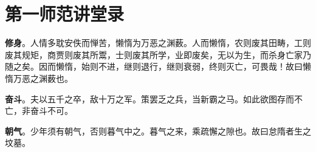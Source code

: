 
\section[第一师范讲堂录（一九一三年十一月一日）]{第一师范讲堂录}

\textbf{修身}。人情多耽安佚而惮苦，懒惰为万恶之渊薮。人而懒惰，农则废其田畴，工则废其规矩，商贾则废其所鬻，士则废其所学，业即废矣，无以为生，而杀身亡家乃随之矣。因而懒惰，始则不进，继则退行，继则衰弱，终则灭亡，可畏哉！故曰懒惰万恶之渊薮也。

\textbf{奋斗}。夫以五千之卒，敌十万之军。策罢乏之兵，当新霸之马。如此欲图存而不亡，非奋斗不可。

\textbf{朝气}。少年须有朝气，否则暮气中之。暮气之来，乘疏懈之隙也。故曰怠隋者生之坟墓。